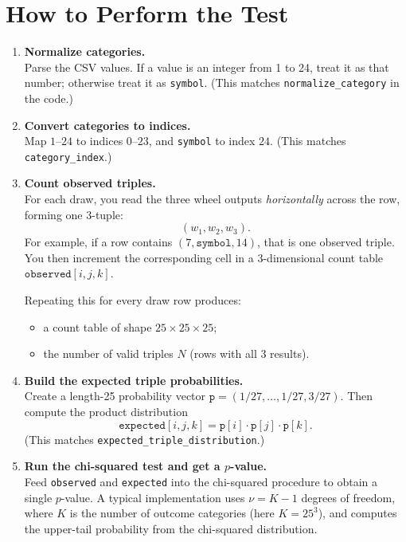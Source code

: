 \section{How to Perform the Test}
\begin{enumerate}
  \item \textbf{Normalize categories.}\\
        Parse the CSV values.  If a value is an integer from 1 to 24, treat it
        as that number; otherwise treat it as \texttt{symbol}.  (This matches
        \texttt{normalize\_category} in the code.)

  \item \textbf{Convert categories to indices.}\\
        Map \(1\)--\(24\) to indices \(0\)--\(23\), and \texttt{symbol} to index
        \(24\).  (This matches \texttt{category\_index}.)

  \item \textbf{Count observed triples.}\\
        For each draw, you read the three wheel outputs \emph{horizontally}
        across the row, forming one 3-tuple:
        \[
          (w_1,w_2,w_3).
        \]
        For example, if a row contains \((7,\texttt{symbol},14)\), that is one
        observed triple.  You then increment the corresponding cell in a
        3-dimensional count table \(\texttt{observed}[i,j,k]\).

        Repeating this for every draw row produces:
        \begin{itemize}
          \item a count table of shape \(25\times 25\times 25\);
          \item the number of valid triples \(N\) (rows with all 3 results).
        \end{itemize}

  \item \textbf{Build the expected triple probabilities.}\\
        Create a length-25 probability vector
        \(\texttt{p} = (1/27,\dots,1/27,3/27)\).  Then compute the product
        distribution
        \[
          \texttt{expected}[i,j,k] = \texttt{p}[i]\cdot \texttt{p}[j]\cdot \texttt{p}[k].
        \]
        (This matches \texttt{expected\_triple\_distribution}.)

  \item \textbf{Run the chi-squared test and get a $p$-value.}\\
        Feed \texttt{observed} and \texttt{expected} into the chi-squared
        procedure to obtain a single $p$-value.  A typical implementation uses
        \(\nu = K-1\) degrees of freedom, where \(K\) is the number of outcome
        categories (here \(K = 25^3\)), and computes the upper-tail probability
        from the chi-squared distribution.
\end{enumerate}

